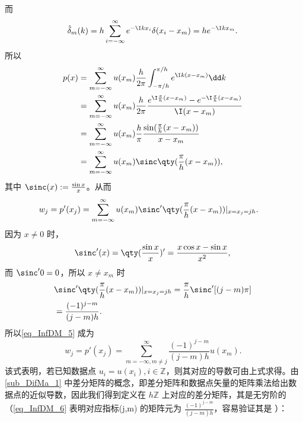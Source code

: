 而
\begin{equation}
\begin{aligned}
\hat\delta_m(k)=h\sum_{i=-\infty}^{\infty}e^{-\I kx_i}\delta(x_i-x_m)=he^{-\I kx_m}.
\end{aligned}~
\end{equation}
所以
\begin{equation}
\begin{aligned}
p(x)&=\sum\limits_{m=-\infty}^\infty u(x_m)\frac{h}{2\pi}\int_{-\pi/h}^{\pi/h} e^{\I k(x-x_m)}\dd k\\
&=\sum\limits_{m=-\infty}^\infty u(x_m)\frac{h}{2\pi}\frac{e^{\I \frac{\pi}{h}(x-x_m)}-e^{-\I \frac{\pi}{h}(x-x_m)}}{\I (x-x_m)}\\
&=\sum\limits_{m=-\infty}^\infty u(x_m)\frac{h}{\pi}\frac{\sin(\frac{\pi}{h}(x-x_m))}{x-x_m}\\
&=\sum\limits_{m=-\infty}^\infty u(x_m)\sinc \qty(\frac{\pi}{h}(x-x_m)),
\end{aligned}~
\end{equation}
其中 $\sinc(x):=\frac{\sin x}{x}$。从而
\begin{equation}\label{eq_InfDM_5}
\begin{aligned}
w_j&=p'(x_j)=\sum\limits_{m=-\infty}^\infty u(x_m)\sinc '\qty(\frac{\pi}{h}(x-x_m))|_{x=x_j=jh}.
\end{aligned}~
\end{equation}
因为 $x\neq0$ 时，
\begin{equation}
\sinc'(x)=\qty(\frac{\sin x}{x})'=\frac{x\cos x-\sin x}{x^2},~
\end{equation}
而 $\sinc'0=0$，所以 $x\neq x_m$ 时
\begin{equation}
\begin{aligned}
&\sinc '\qty(\frac{\pi}{h}(x-x_m))|_{x=x_j=jh}=\frac{\pi}{h}\sinc '[(j-m)\pi]\\
&=\frac{(-1)^{j-m}}{(j-m)h}.
\end{aligned}~
\end{equation}
所以\autoref{eq_InfDM_5} 成为
\begin{equation}\label{eq_InfDM_6}
w_j=p'(x_j)=\sum\limits_{m=-\infty,m\neq j}^\infty \frac{(-1)^{j-m}}{(j-m)h}u(x_m).~
\end{equation}
该式表明，若已知数据点 $u_i=u(x_i),i\in\mathbb Z$，则其对应的导数可由上式求得。由\autoref{sub_DifMa_1}
中差分矩阵的概念，即差分矩阵和数据点矢量的矩阵乘法给出数据点的近似导数，因此我们得到定义在 $h\mathbb Z$ 上对应的差分矩阵，其是无穷阶的（\autoref{eq_InfDM_6} 表明对应指标(j,m) 的矩阵元为 $\frac{(-1)^{j-m}}{(j-m)h}$，容易验证其是 ）：
